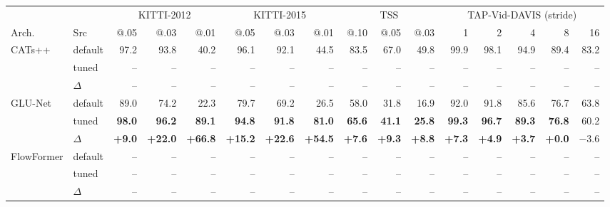 \begin{tabular}{ll rrr rrr rrr rrrrr}
\toprule
 &  & \multicolumn{3}{c}{KITTI-2012} & \multicolumn{3}{c}{KITTI-2015} & \multicolumn{3}{c}{TSS} & \multicolumn{5}{c}{TAP-Vid-DAVIS (stride)} \\
\cmidrule(lr){3-5}\cmidrule(lr){6-8}\cmidrule(lr){9-11}\cmidrule(lr){12-16}
Arch. & Src & @.05 & @.03 & @.01 & @.05 & @.03 & @.01 & @.10 & @.05 & @.03 & 1 & 2 & 4 & 8 & 16 \\
\midrule
\multirow{3}{*}{CATs++} & default & 97.2 & 93.8 & 40.2 & 96.1 & 92.1 & 44.5 & 83.5 & 67.0 & 49.8 & 99.9 & 98.1 & 94.9 & 89.4 & 83.2 \\
 & tuned & -- & -- & -- & -- & -- & -- & -- & -- & -- & -- & -- & -- & -- & -- \\
 & $\Delta$ & -- & -- & -- & -- & -- & -- & -- & -- & -- & -- & -- & -- & -- & -- \\
\midrule
\multirow{3}{*}{GLU-Net} & default & 89.0 & 74.2 & 22.3 & 79.7 & 69.2 & 26.5 & 58.0 & 31.8 & 16.9 & 92.0 & 91.8 & 85.6 & 76.7 & 63.8 \\
 & tuned & \textbf{98.0} & \textbf{96.2} & \textbf{89.1} & \textbf{94.8} & \textbf{91.8} & \textbf{81.0} & \textbf{65.6} & \textbf{41.1} & \textbf{25.8} & \textbf{99.3} & \textbf{96.7} & \textbf{89.3} & \textbf{76.8} & 60.2 \\
 & $\Delta$ & \textbf{+9.0} & \textbf{+22.0} & \textbf{+66.8} & \textbf{+15.2} & \textbf{+22.6} & \textbf{+54.5} & \textbf{+7.6} & \textbf{+9.3} & \textbf{+8.8} & \textbf{+7.3} & \textbf{+4.9} & \textbf{+3.7} & \textbf{+0.0} & $-3.6$ \\
\midrule
\multirow{3}{*}{FlowFormer} & default & -- & -- & -- & -- & -- & -- & -- & -- & -- & -- & -- & -- & -- & -- \\
 & tuned & -- & -- & -- & -- & -- & -- & -- & -- & -- & -- & -- & -- & -- & -- \\
 & $\Delta$ & -- & -- & -- & -- & -- & -- & -- & -- & -- & -- & -- & -- & -- & -- \\
\bottomrule
\end{tabular}
